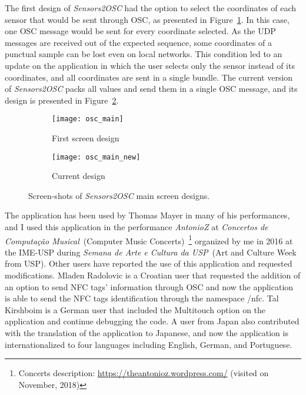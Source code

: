 The first design of \textit{Sensors2OSC} had the option to select the coordinates of each sensor that would be sent through OSC, as presented in Figure~\ref{fig:appsensors2oscfirstdesign}.
In this case, one OSC message would be sent for every coordinate selected.
As the UDP messages are received out of the expected sequence, some coordinates of a punctual sample can be lost even on local networks.
This condition led to an update on the application in which the user selects only the sensor instead of its coordinates, and all coordinates are sent in a single bundle.
The current version of \textit{Sensors2OSC} packs all values and send them in a single OSC message, and its design is presented in Figure~\ref{fig:appsensors2oscseconddesign}.

\begin{figure*}[!ht]
	\centering
	\begin{subfigure}{.30\textwidth}
		\texttt{[image: osc\_main]}
		\caption{First screen design}
		\label{fig:appsensors2oscfirstdesign}
	\end{subfigure}
	\begin{subfigure}{.28\textwidth}
		\texttt{[image: osc\_main\_new]}
		\caption{Current design}
		\label{fig:appsensors2oscseconddesign}
	\end{subfigure}
	
	\caption{Screen-shots of \textit{Sensors2OSC} main screen designs.}
	\label{fig:sensors2oscmainscreen}
\end{figure*}

The application has been used by Thomas Mayer in many of his performances, and I used this application in the performance \textit{AntonioZ} at \textit{Concertos de Computação Musical}~(Computer Music Concerts)~\footnote{Concerts description: \url{https://theantonioz.wordpress.com/} (visited on November, 2018)} organized by me in 2016 at the IME-USP during \textit{Semana de Arte e Cultura da USP}~(Art and Culture Week from USP).
Other users have reported the use of this application and requested modifications.
Mladen Radolovic is a Croatian user that requested the addition of an option to send NFC tags' information through OSC and now the application is able to send the NFC tags identification through the namespace /nfc.
Tal Kirshboim is a German user that included the Multitouch option on the application and continue debugging the code.
A user from Japan also contributed with the translation of the application to Japanese, and now the application is internationalized to four languages including English, German, and Portuguese.

